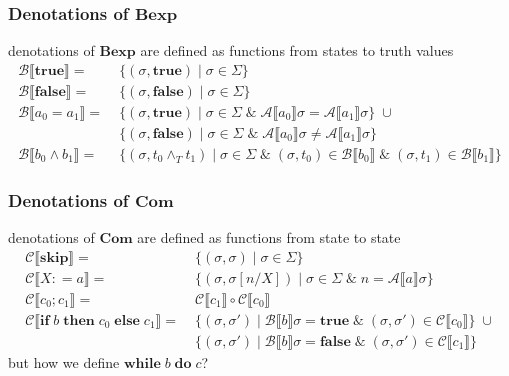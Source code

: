 \documentclass[12pt,aspectratio=169]{beamer}
\newcommand{\Bexp}{\mathbf{Bexp}}
\newcommand{\Com}{\mathbf{Com}}
\newcommand{\denoA}[1]{\mathcal{A} \llbracket #1 \rrbracket}
\newcommand{\denoB}[1]{\mathcal{B} \llbracket #1 \rrbracket}
\newcommand{\denoC}[1]{\mathcal{C} \llbracket #1 \rrbracket}
\newcommand{\true}{\mathbf{true}}
\newcommand{\false}{\mathbf{false}}
\newcommand{\Skip}{\mathbf{skip}}
\def\coloneqq{\mathrel{\mathop:}=}
\newcommand{\Assign}[2]{#1 \coloneqq #2}
\newcommand{\ITE}[3]{\mathbf{if}\; #1 \; \mathbf{then} \; #2 \; \mathbf{else} \; #3}
\newcommand{\While}[2]{\mathbf{while}\; #1 \; \mathbf{do} \; #2}
\begin{document}
\begin{frame}
    \frametitle{Denotations of $\Bexp$}
    denotations of $\Bexp$ are defined as functions from states to truth values
        \begin{align*}
            \denoB{\true} = & \; \{(\sigma, \true) \mid \sigma \in \Sigma\} \\
            \denoB{\false} = & \; \{ (\sigma,\false) \mid \sigma \in \Sigma\} \\
            \denoB{a_0 = a_1} = & \;
            \{ (\sigma, \true) \mid \sigma \in \Sigma \; \& \; \denoA{a_0}\sigma = \denoA{a_1}\sigma\} \; \cup\\
            & \; \{ (\sigma, \false) \mid \sigma \in \Sigma \; \& \; \denoA{a_0}\sigma \neq \denoA{a_1}\sigma\}\\
            \denoB{b_0 \land b_1} = & \; \{(\sigma, t_0 \land_T t_1) \mid \sigma \in \Sigma \; \& \; (\sigma,t_0) \in \denoB{b_0} \; \& \; (\sigma,t_1) \in \denoB{b_1} \}
        \end{align*}
    \begin{example}

    \end{example}
\end{frame}

\begin{frame}
    \frametitle{Denotations of $\Com$}
    denotations of $\Com$ are defined as functions from state to state
    \begin{align*}
        \denoC{\Skip} =& \;\{(\sigma,\sigma) \mid \sigma \in \Sigma\}\\
        \denoC{\Assign{X}{a}} =& \;\{(\sigma,\sigma[n/X]) \mid \sigma \in \Sigma \; \& \; n = \denoA{a}\sigma\}\\
        \denoC{c_0;c_1} =& \;\denoC{c_1} \circ \denoC{c_0}\\
        \denoC{\ITE{b}{c_0}{c_1}} =& \;
            \{(\sigma,\sigma') \mid \denoB{b}\sigma = \true \; \& \; (\sigma, \sigma') \in \denoC{c_0}\} \; \cup\\
            & \;\{(\sigma,\sigma') \mid \denoB{b}\sigma = \false \; \& \; (\sigma, \sigma') \in \denoC{c_1}\}
    \end{align*}
    but how we define $\While{b}{c}$?
\end{frame}
\end{document}
